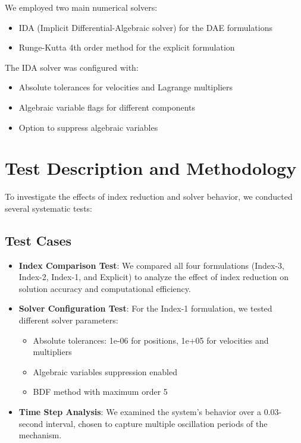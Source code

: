\documentclass{article}
\begin{document}
We employed two main numerical solvers:

\begin{itemize}
    \item IDA (Implicit Differential-Algebraic solver) for the DAE formulations
    \item Runge-Kutta 4th order method for the explicit formulation
\end{itemize}

The IDA solver was configured with:
\begin{itemize}
    \item Absolute tolerances for velocities and Lagrange multipliers
    \item Algebraic variable flags for different components
    \item Option to suppress algebraic variables
\end{itemize}

\section*{Test Description and Methodology}
\indent

To investigate the effects of index reduction and solver behavior, we conducted several systematic tests:

\subsection{Test Cases}
\begin{itemize}
    \item \textbf{Index Comparison Test}: We compared all four formulations (Index-3, Index-2, Index-1, and Explicit) to analyze the effect of index reduction on solution accuracy and computational efficiency.
    
    \item \textbf{Solver Configuration Test}: For the Index-1 formulation, we tested different solver parameters:
    \begin{itemize}
        \item Absolute tolerances: 1e-06 for positions, 1e+05 for velocities and multipliers
        \item Algebraic variables suppression enabled
        \item BDF method with maximum order 5
    \end{itemize}
    
    \item \textbf{Time Step Analysis}: We examined the system's behavior over a 0.03-second interval, chosen to capture multiple oscillation periods of the mechanism.
\end{itemize}
\end{document}
